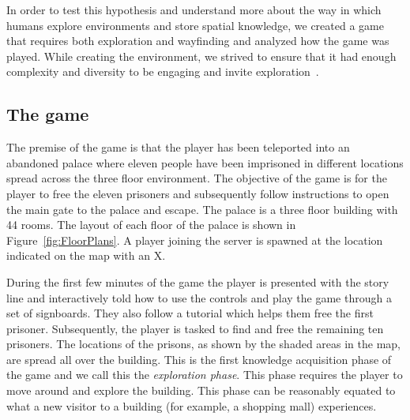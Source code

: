 In order to test this hypothesis and understand more about the way in which humans explore environments and store spatial knowledge, we created a game that requires both exploration and wayfinding and analyzed how the game was played. While creating the environment, we strived to ensure that it had enough complexity and diversity to be engaging and invite exploration~\cite{kaplan1983cognition,Montello:2004uj}.

\subsection{The game}
\label{sec:the_game}


The premise of the game is that the player has been teleported into an abandoned palace where eleven people have been imprisoned in different locations spread across the three floor environment. The objective of the game is for the player to free the eleven prisoners and subsequently follow instructions to open the main gate to the palace and escape. The palace is a three floor building with 44 rooms. The layout of each floor of the palace is shown in Figure~\ref{fig:FloorPlans}. A player joining the server is spawned at the location indicated on the map with an X.


During the first few minutes of the game the player is presented with the story line and interactively told how to use the controls and play the game through a set of signboards. They also follow a tutorial which helps them free the first prisoner. Subsequently, the player is tasked to find and free the remaining ten prisoners. The locations of the prisons, as shown by the shaded areas in the map, are spread all over the building. This is the first knowledge acquisition phase of the game and we call this the \emph{exploration phase}. This phase requires the player to move around and explore the building. This phase can be reasonably equated to what a new visitor to a building (for example, a shopping mall) experiences.




